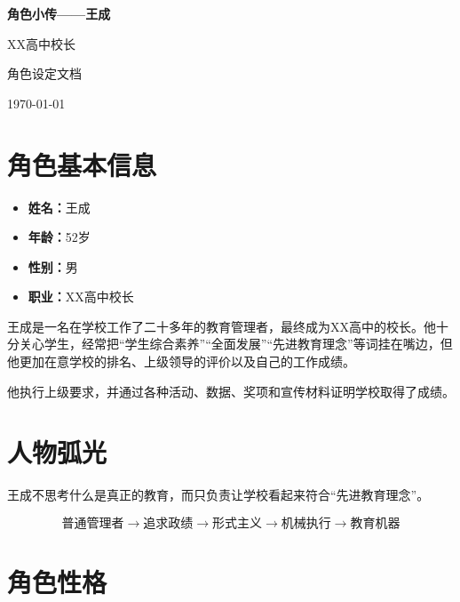 \documentclass[12pt,a4paper]{ctexart}
\begin{document}
	
	\begin{titlepage}
		\centering
		\vspace*{4cm}
		
		{\Huge\bfseries 角色小传——王成\par}
		\vspace{2cm}
		
		{\Large XX高中校长\par}
		\vfill
		
		{\large 角色设定文档\par}
		\vspace{1cm}
		
		{\large \today\par}
	\end{titlepage}
	
	\tableofcontents
	\newpage
	
	\section{角色基本信息}
	
	\begin{itemize}[leftmargin=2em]
		\item \textbf{姓名：}王成
		\item \textbf{年龄：}52岁
		\item \textbf{性别：}男
		\item \textbf{职业：}XX高中校长
	\end{itemize}
	
	王成是一名在学校工作了二十多年的教育管理者，最终成为XX高中的校长。他十分关心学生，经常把“学生综合素养”“全面发展”“先进教育理念”等词挂在嘴边，但他更加在意学校的排名、上级领导的评价以及自己的工作成绩。
	
	他执行上级要求，并通过各种活动、数据、奖项和宣传材料证明学校取得了成绩。
	
	\section{人物弧光}
	
	王成不思考什么是真正的教育，而只负责让学校看起来符合“先进教育理念”。
	
	\[
	\text{普通管理者} \rightarrow \text{追求政绩} \rightarrow \text{形式主义}
	\rightarrow \text{机械执行} \rightarrow \text{教育机器}
	\]
	
	\section{角色性格}
	
\end{document}
